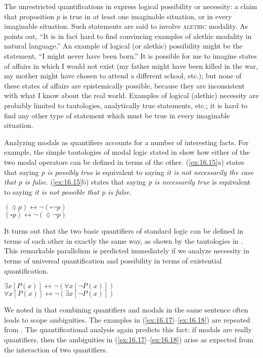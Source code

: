 The unrestricted quantifications in  express logical possibility or necessity: a claim that proposition $p$ is true in at least one imaginable situation, or in every imaginable situation. Such statements are said to involve \textsc{alethic} modality. As  \citet{vonFintel2006} points out, “It is in fact hard to find convincing examples of alethic modality in natural language.” An example of logical (or alethic) possibility might be the statement, “I might never have been born.” It is possible for me to imagine states of affairs in which I would not exist (my father might have been killed in the war, my mother might have chosen to attend a different school, etc.); but none of these states of affairs are epistemically possible, because they are inconsistent with what I know about the real world. Examples of logical (alethic) necessity are probably limited to tautologies, analytically true statements, etc.; it is hard to find any other type of statement which must be true in every imaginable situation.



Analyzing modals as quantifiers accounts for a number of interesting facts. For example, the simple tautologies of modal logic stated in  show how either of the two modal operators can be defined in terms of the other. (\ref{ex:16.15}a) states that saying \textit{p is possibly true} is equivalent to saying \textit{it is not necessarily the case that $p$ is false}. (\ref{ex:16.15}b) states that saying \textit{p is necessarily true} is equivalent to saying \textit{it is not possible that p is false}.


\ea \label{ex:16.15}
\ea   $(\lozenge p)  \leftrightarrow \neg (\square \neg p)$\\
\ex   $(\square  p)  \leftrightarrow \neg (\lozenge \neg p)$
   \z
\z


It turns out that the two basic quantifiers of standard logic can be defined in terms of each other in exactly the same way, as shown by the tautologies in . This remarkable parallelism is predicted immediately if we analyze necessity in terms of universal quantification and possibility in terms of existential quantification.


\ea \label{ex:16.16}
\ea   $\exists x [P(x)]   \leftrightarrow \neg (\forall x [\neg P(x)])$\\
\ex   $\forall x [P(x)]   \leftrightarrow \neg (\exists x [\neg P(x)])$
     \z
\z


We noted in  that combining quantifiers and modals in the same sentence often leads to scope ambiguities. The examples in (\ref{ex:16.17}--\ref{ex:16.18}) are repeated from . The quantificational analysis again predicts this fact: if modals are really quantifiers, then the ambiguities in (\ref{ex:16.17}--\ref{ex:16.18}) arise as expected from the interaction of two quantifiers.


